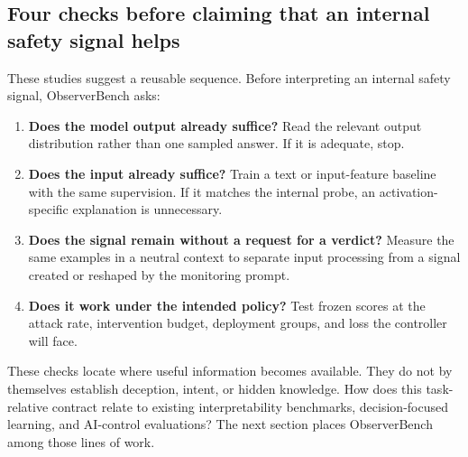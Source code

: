 \subsection{Four checks before claiming that an internal safety signal helps}

These studies suggest a reusable sequence. Before interpreting an internal
safety signal, ObserverBench asks:

\begin{enumerate}[leftmargin=1.4em,itemsep=0.2em,topsep=0.25em]
  \item \textbf{Does the model output already suffice?} Read the relevant output
  distribution rather than one sampled answer. If it is adequate, stop.
  \item \textbf{Does the input already suffice?} Train a text or input-feature
  baseline with the same supervision. If it matches the internal probe, an
  activation-specific explanation is unnecessary.
  \item \textbf{Does the signal remain without a request for a verdict?} Measure
  the same examples in a neutral context to separate input processing from a
  signal created or reshaped by the monitoring prompt.
  \item \textbf{Does it work under the intended policy?} Test frozen scores at
  the attack rate, intervention budget, deployment groups, and loss the
  controller will face.
\end{enumerate}

These checks locate where useful information becomes available. They do not by
themselves establish deception, intent, or hidden knowledge. How does this
task-relative contract relate to existing interpretability
benchmarks, decision-focused learning, and AI-control evaluations? The next
section places ObserverBench among those lines of work.
